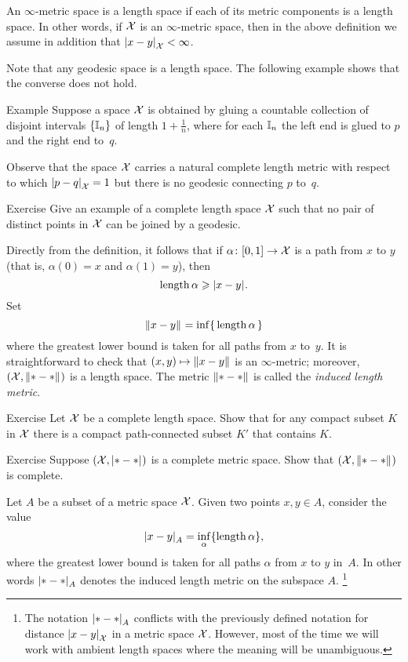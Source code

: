 An $\infty$-metric space is a length space if each of its metric components is a length space.
In other words, if $\mathcal{X}$ is an $\infty$-metric space, then in the above definition we assume in addition that $\dist{x}{y}{\spc{X}}<\infty$.

Note that any geodesic space is a length space.
The following example shows that the converse does not hold.


\begin{thm}{Example}
Suppose a space $\mathcal{X}$ is obtained by gluing a countable collection of disjoint intervals $\{\mathbb{I}_n\}$ of length $1+\tfrac1n$, where for each $\mathbb{I}_n$ the left end is glued to $p$ and the right end to~$q$.

Observe that the space $\mathcal{X}$ carries a natural complete length metric with respect to which $\dist{p}{q}{\spc{X}}=1$ but there is no geodesic connecting $p$ to~$q$.
\end{thm}

\begin{thm}{Exercise}\label{ex:no-geod}
Give an example of a complete length space $\mathcal{X}$ such that no pair of distinct points in $\mathcal{X}$ can be joined by a geodesic.
\end{thm}

Directly from the definition, it follows that if $\alpha\colon[0,1]\to\mathcal{X}$ is a path from $x$ to $y$ 
(that is, $\alpha(0)=x$ and $\alpha(1)=y$), then 
\[\length\alpha\ge \dist{x}{y}{}.\]
Set 
\[\yetdist{x}{y}{}=\inf\{\,\length\alpha\,\}\]
where the greatest lower bound is taken for all paths from $x$ to~$y$.
It is straightforward to check that $(x,y)\mapsto \yetdist{x}{y}{}$ is an $\infty$-metric; moreover, $(\spc{X},\yetdist{*}{*}{})$ is a length space.
The metric $\yetdist{*}{*}{}$ is called the \emph{induced length metric}.

\begin{thm}{Exercise}\label{ex:compact+connceted}
Let $\mathcal{X}$ be a complete length space.
Show that for any compact subset $K$ in $\mathcal{X}$
there is a compact path-connected subset $K'$ that contains $K$.  
\end{thm}

\begin{thm}{Exercise}\label{ex:compact=>complete}
Suppose $(\spc{X},\dist{*}{*}{})$ is a complete metric space.
Show that $(\spc{X},\yetdist{*}{*}{})$ is complete.
\end{thm}

Let $A$ be a subset of a metric space $\mathcal{X}$.
Given two points $x,y\in A$,
consider the value
\[\dist{x}{y}{A}=\inf_{\alpha}\{\length\alpha\},\]
where the greatest lower bound is taken for all paths $\alpha$ from $x$ to $y$ in~$A$.
In other words $\dist{*}{*}{A}$ denotes the induced length metric on the subspace $A$.%
\footnote{The notation $\dist{*}{*}{A}$ conflicts with the previously defined notation for distance $\dist{x}{y}{\spc{X}}$ in a metric space $\mathcal{X}$. However, most of the time we will work with ambient length spaces where the meaning will be unambiguous.}

